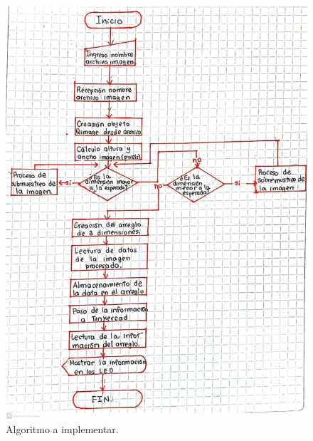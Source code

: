 \documentclass{article}
\begin{document}
  \begin{figure}
  
  \centering
  
  \includegraphics[width=1.3\textwidth]{Algoritmo.png}
  
  \caption{\label{fig1r}Algoritmo a implementar.}
  
  \end{figure}
  
\newpage
\end{document}

